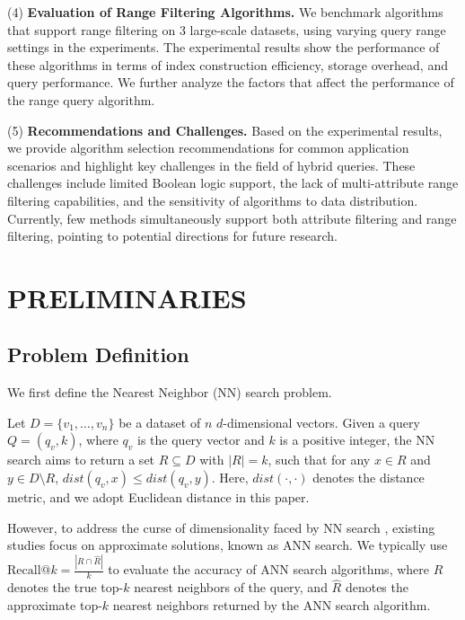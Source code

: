 \documentclass[sigconf, nonacm]{acmart}
\begin{document}
	(4)\textbf{ Evaluation of Range Filtering Algorithms.}
	We benchmark algorithms that support range filtering on 3 large-scale datasets, using varying query range settings in the experiments. The experimental results show the performance of these algorithms in terms of index construction efficiency, storage overhead, and query performance. We further analyze the factors that affect the performance of the range query algorithm.
	
	
	(5)\textbf{ Recommendations and Challenges.}
	Based on the experimental results, we provide algorithm selection recommendations for common application scenarios and highlight key challenges in the field of hybrid queries. These challenges include limited Boolean logic support, the lack of multi-attribute range filtering capabilities, and the sensitivity of algorithms to data distribution. Currently, few methods simultaneously support both attribute filtering and range filtering, pointing to potential directions for future research.
	
	\section{PRELIMINARIES}
	
	\subsection{Problem Definition}
	
	We first define the Nearest Neighbor (NN) search problem.
	
	\begin{definition}[NN Search]
		
		Let \( D = \{v_1, \ldots, v_n\} \) be a dataset of \( n \) \( d \)-dimensional vectors. Given a query \( Q = (q_v, k) \), where \( q_v \) is the query vector and \( k \) is a positive integer, the NN search aims to return a set \( R \subseteq D \) with \( |R| = k \), such that for any \( x \in R \) and \( y \in D \setminus R \), \( \textit{dist}\!\left(q_v, x\right) \leq \textit{dist}\!\left(q_v, y\right) \). Here, \( \textit{dist}\!\left(\cdot, \cdot\right) \) denotes the distance metric, and we adopt Euclidean distance in this paper.
	\end{definition}
	
	However, to address the curse of dimensionality faced by NN search \cite{dimcurse}, existing studies focus on approximate solutions, known as ANN  search. We typically use $\text{Recall}@k = \frac{|R \cap \hat{R}|}{k}$ to evaluate the accuracy of ANN search algorithms, where $R$ denotes the true top-$k$ nearest neighbors of the query, and $\hat{R}$ denotes the approximate top-$k$ nearest neighbors returned by the ANN search algorithm.
	
\end{document}
